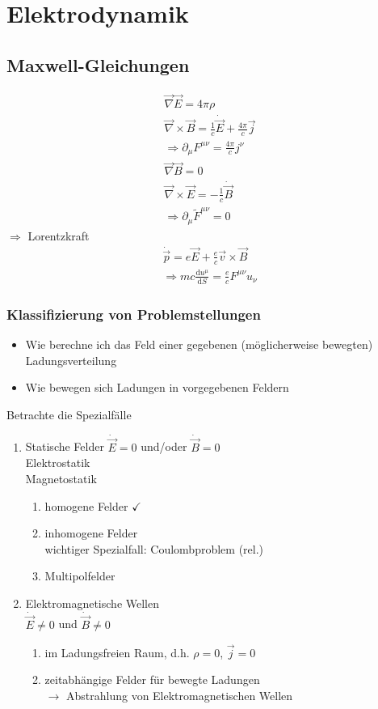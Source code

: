 \documentclass[a4paper]{article}
\begin{document}
\section{Elektrodynamik}
\subsection{Maxwell-Gleichungen}
\begin{align}
\vec{\nabla}\vec{E}=4\pi\rho\\
\vec{\nabla}\times\vec{B}=\frac{1}{c}\dot{\vec{E}}+\frac{4\pi}{c}\vec{j}\\
\Rightarrow \partial_\mu F^{\mu\nu}=\frac{4\pi}{c}j^\nu\\
\vec{\nabla}\vec{B}=0\\
\vec{\nabla}\times\vec{E}=-\frac{1}{c}\dot{\vec{B}}\\
\Rightarrow \partial_\mu \tilde{F}^{\mu\nu}=0
\end{align}
$\Rightarrow$ Lorentzkraft
\begin{align}
\dot{\vec{p}}=e\vec{E}+\frac{e}{c}\vec{v}\times\vec{B}\\
\Rightarrow mc\frac{\mathrm{d}u^\mu}{\mathrm{d}S}=\frac{e}{c}F^{\mu\nu}u_\nu
\end{align}
\subsubsection{Klassifizierung von Problemstellungen}
\begin{itemize}
  \item Wie berechne ich das Feld einer gegebenen (möglicherweise bewegten)
  Ladungsverteilung
  \item Wie bewegen sich Ladungen in vorgegebenen Feldern
\end{itemize}
Betrachte die Spezialfälle
\begin{enumerate}
  \item Statische Felder $\dot{\vec{E}}=0$ und/oder $\dot{\vec{B}}=0$\\
  Elektrostatik \\ Magnetostatik
\begin{enumerate}
  \item homogene Felder $\checkmark$
  \item inhomogene Felder \\ wichtiger Spezialfall: Coulombproblem (rel.)
  \item Multipolfelder 
\end{enumerate}
  \item Elektromagnetische Wellen \\ $\dot{\vec{E}}\neq0$ und
  $\dot{\vec{B}}\neq0$
  \begin{enumerate}
  \item im Ladungsfreien Raum, d.h. $\rho=0$, $\vec{j}=0$
  \item zeitabhängige Felder für bewegte Ladungen \\ $\rightarrow$ Abstrahlung
  von Elektromagnetischen Wellen
\end{enumerate}
\end{enumerate}
\end{document}
